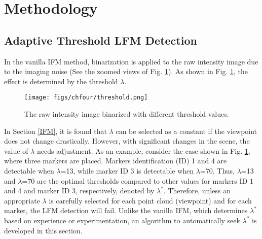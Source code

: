 \section{Methodology} \label{new5.2}
\subsection{Adaptive Threshold LFM Detection} \label{5.2}
In the vanilla IFM method, binarization is applied to the raw intensity image due to the imaging noise (See the zoomed views of Fig. \ref{threshold}). As shown in Fig. \ref{threshold}, the effect is determined by the threshold $\lambda$.
%
\begin{figure}[H] 
	\centering
\texttt{[image: figs/chfour/threshold.png]}
	\caption{The raw intensity image binarized with different threshold values.}
	\label{threshold}
\end{figure}
%
In Section \ref{IFM}, it is found that $\lambda$ can be selected as a constant if the viewpoint does not change drastically. However, with significant changes in the scene, the value of $\lambda$ needs adjustment. 
%
As an example, consider the case shown in Fig. \ref{threshold}, where three markers are placed. Markers identification (ID) 1 and 4 are detectable when $\lambda$=13, while marker ID 3 is detectable when $\lambda$=70. Thus, $\lambda$=13 and $\lambda$=70 are the optimal thresholds compared to other values for markers ID 1 and 4 and marker ID 3, respectively, denoted by $\lambda^{*}$.
%
Therefore, unless an appropriate $\lambda$ is carefully selected for each point cloud (viewpoint) and for each marker, the LFM detection will fail.
%
Unlike the vanilla IFM, which determines $\lambda^{*}$ based on experience or experimentation, an algorithm to automatically seek $\lambda^{*}$ is developed in this section.
